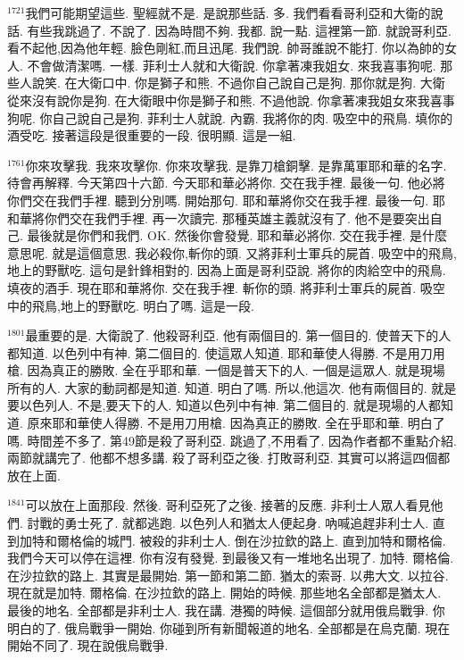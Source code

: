 \documentclass{book}
\begin{document}
$^{1721}$我們可能期望這些.
聖經就不是.
是說那些話.
多.
我們看看哥利亞和大衛的說話.
有些我跳過了.
不說了.
因為時間不夠.
我都.
說一點.
這裡第一節.
就說哥利亞.
看不起他,因為他年輕.
臉色剛紅,而且迅尾.
我們說.
帥哥誰說不能打.
你以為帥的女人.
不會做清潔嗎.
一樣.
菲利士人就和大衛說.
你拿著凍我姐女.
來我喜事狗呢.
那些人說笑.
在大衛口中.
你是獅子和熊.
不過你自己說自己是狗.
那你就是狗.
大衛從來沒有說你是狗.
在大衛眼中你是獅子和熊.
不過他說.
你拿著凍我姐女來我喜事狗呢.
你自己說自己是狗.
菲利士人就說.
內霸.
我將你的肉.
吸空中的飛鳥.
填你的酒受吃.
接著這段是很重要的一段.
很明顯.
這是一組.

$^{1761}$你來攻擊我.
我來攻擊你.
你來攻擊我.
是靠刀槍銅擊.
是靠萬軍耶和華的名字.
待會再解釋.
今天第四十六節.
今天耶和華必將你.
交在我手裡.
最後一句.
他必將你們交在我們手裡.
聽到分別嗎.
開始那句.
耶和華將你交在我手裡.
最後一句.
耶和華將你們交在我們手裡.
再一次讀完.
那種英雄主義就沒有了.
他不是要突出自己.
最後就是你們和我們.
OK.
然後你會發覺.
耶和華必將你.
交在我手裡.
是什麼意思呢.
就是這個意思.
我必殺你,斬你的頭.
又將菲利士軍兵的屍首.
吸空中的飛鳥,地上的野獸吃.
這句是針鋒相對的.
因為上面是哥利亞說.
將你的肉給空中的飛鳥.
填夜的酒手.
現在耶和華將你.
交在我手裡.
斬你的頭.
將菲利士軍兵的屍首.
吸空中的飛鳥,地上的野獸吃.
明白了嗎.
這是一段.

$^{1801}$最重要的是.
大衛說了.
他殺哥利亞.
他有兩個目的.
第一個目的.
使普天下的人都知道.
以色列中有神.
第二個目的.
使這眾人知道.
耶和華使人得勝.
不是用刀用槍.
因為真正的勝敗.
全在乎耶和華.
一個是普天下的人.
一個是這眾人.
就是現場所有的人.
大家的動詞都是知道.
知道.
明白了嗎.
所以,他這次.
他有兩個目的.
就是要以色列人.
不是,要天下的人.
知道以色列中有神.
第二個目的.
就是現場的人都知道.
原來耶和華使人得勝.
不是用刀用槍.
因為真正的勝敗.
全在乎耶和華.
明白了嗎.
時間差不多了.
第49節是殺了哥利亞.
跳過了,不用看了.
因為作者都不重點介紹.
兩節就講完了.
他都不想多講.
殺了哥利亞之後.
打敗哥利亞.
其實可以將這四個都放在上面.

$^{1841}$可以放在上面那段.
然後.
哥利亞死了之後.
接著的反應.
非利士人眾人看見他們.
討戰的勇士死了.
就都逃跑.
以色列人和猶太人便起身.
吶喊追趕非利士人.
直到加特和爾格倫的城門.
被殺的非利士人.
倒在沙拉欽的路上.
直到加特和爾格倫.
我們今天可以停在這裡.
你有沒有發覺.
到最後又有一堆地名出現了.
加特.
爾格倫.
在沙拉欽的路上.
其實是最開始.
第一節和第二節.
猶太的索哥.
以弗大文.
以拉谷.
現在就是加特.
爾格倫.
在沙拉欽的路上.
開始的時候.
那些地名全部都是猶太人.
最後的地名.
全部都是非利士人.
我在講.
港獨的時候.
這個部分就用俄烏戰爭.
你明白的了.
俄烏戰爭一開始.
你碰到所有新聞報道的地名.
全部都是在烏克蘭.
現在開始不同了.
現在說俄烏戰爭.
\end{document}
